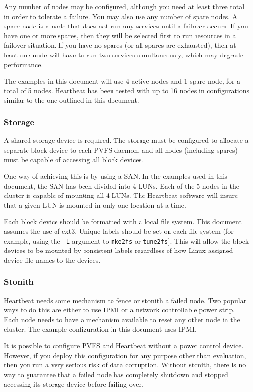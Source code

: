 \documentclass[11pt]{article}
\begin{document}
Any number of nodes may be configured, although you need at least three
total in order to tolerate a failure.  You may also use any number of
spare nodes.  A spare node is a node that does not run any services until
a failover occurs.  If you have one or more spares, then they will be
selected first to run resources in a failover situation.  If you have
no spares (or all spares are exhausted), then at least one node will
have to run two services simultaneously, which may degrade performance.

The examples in this document will use 4 active nodes and 1 spare node,
for a total of 5 nodes.  Heartbeat has been tested with up to 16 nodes
in configurations similar to the one outlined in this document.

\subsubsection{Storage}

A shared storage device is required.  The storage must be configured
to allocate a separate block device to each PVFS daemon, and all nodes
(including spares) must be capable of accessing all block devices.

One way of achieving this is by using a SAN.  In the examples used in this
document, the SAN has been divided into 4 LUNs.  Each of the 5 nodes in
the cluster is capable of mounting all 4 LUNs.  The Heartbeat software
will insure that a given LUN is mounted in only one location at a time.

Each block device should be formatted with a local file system.
This document assumes the use of ext3.  Unique labels should be set on
each file system (for example, using the \texttt{-L} argument to
\texttt{mke2fs} or \texttt{tune2fs}).  This will allow the block devices
to be mounted by consistent labels regardless of how Linux assigned
device file names to the devices.

\subsubsection{Stonith}

Heartbeat needs some mechanism to fence or stonith a failed node.
Two popular ways to do this are either to use IPMI or a network
controllable power strip.  Each node needs to have a mechanism available
to reset any other node in the cluster.  The example configuration in
this document uses IPMI.

It is possible to configure PVFS and Heartbeat without a power control
device.  However, if you deploy this configuration for any purpose other
than evaluation, then you run a very serious risk of data
corruption.   Without stonith, there is no way to guarantee that a
failed node has completely shutdown and stopped accessing its
storage device before failing over.
\end{document}
